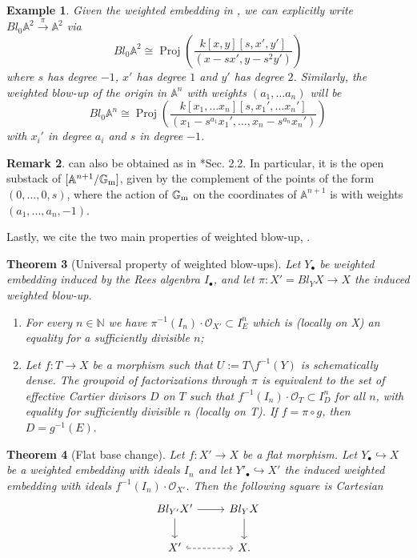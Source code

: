 \documentclass{amsart}
\newcommand{\bA}{\mathbb{A}}
\newcommand{\bG}{\mathbb{G}}
\newcommand{\bN}{\mathbb{N}}
\newcommand{\cO}{\mathcal{O}}
\newcommand{\stProj}{\operatorname{Proj}}
\newcommand{\Gm}{\bG_{{\rm m}}}
\newtheorem{theorem}{Theorem}[section]
\newtheorem{example}[theorem]{Example}
\theoremstyle{definition}
\newtheorem{Remark}[theorem]{Remark}
\begin{document}
\begin{example}\label{blowupoftheorigin} Given the weighted embedding in , we can explicitly write $Bl_{0}\bA^2 \xrightarrow{\pi}\bA^2$ via  $$Bl_{0}\bA^2 \cong \stProj \left(\frac{k[x,y][s,x',y']}{(x-sx', y-s^2y')}\right)$$
where $s$ has degree $-1$, $x'$ has degree $1$ and $y'$ has degree $2$.
Similarly, the weighted blow-up of the origin in $\bA^n$ with weights $(a_1,\dots a_n)$ will be $$Bl_{0}\bA^n \cong \stProj\left(\frac{k[x_1,\dots x_n][s,x_1',\dots x_n']}{(x_1-s^{a_1}x_1',\dots, x_n-s^{a_n}x_n')}\right)$$ with $x_i'$ in degree $a_i$ and $s$ in degree $-1$.
\end{example}
\begin{Remark}
     can also be obtained as in \cite{Inc}*{Sec. 2.2}. In particular, it is the open substack of $[\bA^{n+1}/\Gm]$, given by the complement of the points of the form $(0,...,0,s)$, where the action of $\Gm$ on the coordinates of $\bA^{n+1}$ is with weights $(a_1,...,a_n,-1)$.
\end{Remark}
Lastly, we cite the two main properties of weighted blow-up, \cite[Thm. 3.2.9 and Cor. 3.2.14]{QR}. 
\begin{theorem}[Universal property of weighted blow-ups]\label{thm_univ_property_wblowup}
    Let $Y_\bullet$ be weighted embedding induced by the Rees algenbra $I_\bullet$, and let $\pi: X'=Bl_YX \rightarrow X$ the induced weighted blow-up. \begin{enumerate}
        \item For every $n \in \bN$ we have $\pi^{-1}(I_n)\cdot \cO_{X'}\subset I^n_E$ which is (locally on X) an equality for a sufficiently divisible $n$;
        \item Let $f: T \rightarrow X$ be a morphism such that $U:=T \setminus f^{-1}(Y)$ is schematically dense. The groupoid of factorizations through $\pi$ is equivalent to the set of effective Cartier divisors $D$ on $T$ such that $f^{-1}(I_n) \cdot \cO_T \subset I^n_D$ for all $n$, with equality for sufficiently divisible $n$ (locally on T). If $f=\pi \circ g$, then $D=g^{-1}(E).$
    \end{enumerate}  
\end{theorem}
\begin{theorem}[Flat base change]\label{flat_bc_wblowups}
    Let $f: X' \rightarrow X$ be a flat morphism. Let $Y_\bullet \hookrightarrow X$ be a weighted embedding with ideals $I_n$ and let $Y'_\bullet \hookrightarrow X'$ the induced weighted embedding with ideals $f^{-1}(I_n)\cdot \cO_{X'}$. Then the following square is Cartesian 
    $$\begin{tikzcd}
    Bl_{Y'}X' \arrow[d] \arrow[r] & Bl_{Y}X \arrow[d] \\
    X' \arrow[r, dashed, hook]   & X.                \end{tikzcd}$$
\end{theorem}
\end{document}
